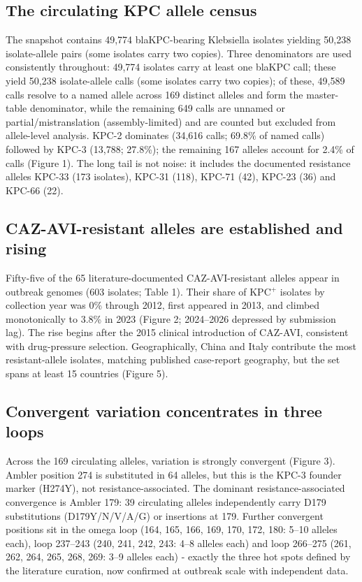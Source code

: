 \documentclass[11pt]{article}
\begin{document}
\subsection{The circulating KPC allele census}
The snapshot contains 49,774 blaKPC-bearing Klebsiella isolates yielding 50,238 isolate-allele pairs (some isolates carry two copies). Three denominators are used consistently throughout: 49,774 isolates carry at least one blaKPC call; these yield 50,238 isolate-allele calls (some isolates carry two copies); of these, 49,589 calls resolve to a named allele across 169 distinct alleles and form the master-table denominator, while the remaining 649 calls are unnamed or partial/mistranslation (assembly-limited) and are counted but excluded from allele-level analysis. KPC-2 dominates (34,616 calls; 69.8\% of named calls) followed by KPC-3 (13,788; 27.8\%); the remaining 167 alleles account for 2.4\% of calls (Figure 1). The long tail is not noise: it includes the documented resistance alleles KPC-33 (173 isolates), KPC-31 (118), KPC-71 (42), KPC-23 (36) and KPC-66 (22).

\subsection{CAZ-AVI-resistant alleles are established and rising}
Fifty-five of the 65 literature-documented CAZ-AVI-resistant alleles appear in outbreak genomes (603 isolates; Table 1). Their share of KPC$^+$ isolates by collection year was 0\% through 2012, first appeared in 2013, and climbed monotonically to 3.8\% in 2023 (Figure 2; 2024--2026 depressed by submission lag). The rise begins after the 2015 clinical introduction of CAZ-AVI, consistent with drug-pressure selection. Geographically, China and Italy contribute the most resistant-allele isolates, matching published case-report geography, but the set spans at least 15 countries (Figure 5).

\subsection{Convergent variation concentrates in three loops}
Across the 169 circulating alleles, variation is strongly convergent (Figure 3). Ambler position 274 is substituted in 64 alleles, but this is the KPC-3 founder marker (H274Y), not resistance-associated. The dominant resistance-associated convergence is Ambler 179: 39 circulating alleles independently carry D179 substitutions (D179Y/N/V/A/G) or insertions at 179. Further convergent positions sit in the omega loop (164, 165, 166, 169, 170, 172, 180: 5--10 alleles each), loop 237--243 (240, 241, 242, 243: 4--8 alleles each) and loop 266--275 (261, 262, 264, 265, 268, 269: 3--9 alleles each) - exactly the three hot spots defined by the literature curation, now confirmed at outbreak scale with independent data.
\end{document}
